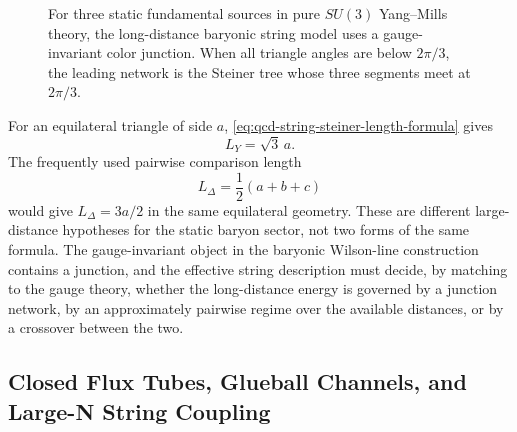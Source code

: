\begin{figure}[H]
  \centering
  \caption{For three static fundamental sources in pure \(SU(3)\) Yang--Mills
  theory, the long-distance baryonic string model uses a gauge-invariant
  color junction.  When all triangle angles are below \(2\pi/3\), the leading
  network is the Steiner tree whose three segments meet at \(2\pi/3\).}
  \label{fig:qcd-string-baryonic-y-network}
\end{figure}

For an equilateral triangle of side \(a\),
\eqref{eq:qcd-string-steiner-length-formula} gives
\[
  L_Y=\sqrt3\,a .
\]
The frequently used pairwise comparison length
\[
  L_\Delta=\frac12(a+b+c)
\]
would give \(L_\Delta=3a/2\) in the same equilateral geometry.  These are
different large-distance hypotheses for the static baryon sector, not two
forms of the same formula.  The gauge-invariant object in the baryonic
Wilson-line construction contains a junction, and the effective string
description must decide, by matching to the gauge theory, whether the
long-distance energy is governed by a junction network, by an approximately
pairwise regime over the available distances, or by a crossover between the
two.

\subsection{Closed Flux Tubes, Glueball Channels, and Large-N String Coupling}

